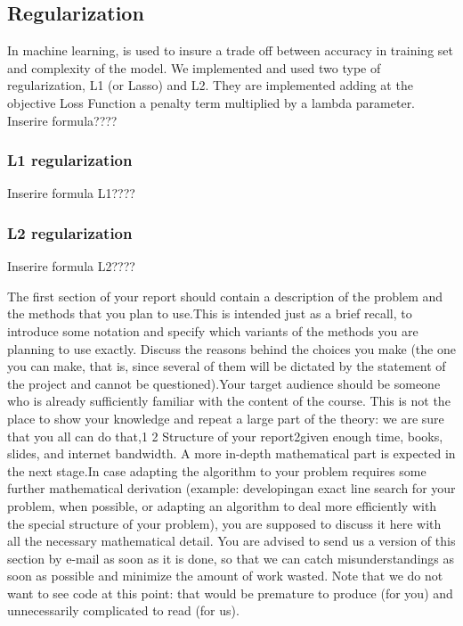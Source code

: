 \subsection{Regularization}
 In machine learning, is used to insure a trade off between accuracy in training set and complexity of the model.
 We implemented and used two type of regularization, L1 (or Lasso) and L2. They are implemented adding at the objective Loss Function a penalty term multiplied by a lambda parameter.
 Inserire formula????
 
\subsubsection{L1 regularization}
 Inserire formula L1???? 
\subsubsection{L2 regularization}
 Inserire formula L2????
 
The first section of your report should contain a description of the problem and the methods that you plan to use.This is intended just as a brief recall, to introduce some notation and specify which variants of the methods you are planning to use exactly. Discuss the reasons behind the choices you make (the one you can make, that is, since several of them will be dictated by the statement of the project and cannot be questioned).Your target audience should be someone who is already sufficiently familiar with the content of the course. This is not the place to show your knowledge and repeat a large part of the theory: we are sure that you all can do that,1
2 Structure of your report2given enough time, books, slides, and internet bandwidth. A more in-depth mathematical part is expected in the next stage.In case adapting the algorithm to your problem requires some further mathematical derivation (example: developingan exact line search for your problem, when possible, or adapting an algorithm to deal more efficiently with the special structure of your problem), you are supposed to discuss it here with all the necessary mathematical detail. You are advised to send us a version of this section by e-mail as soon as it is done, so that we can catch misunderstandings as soon as possible and minimize the amount of work wasted. Note that we do not want to see code at this point: that would be premature to produce (for you) and unnecessarily complicated to read (for us).